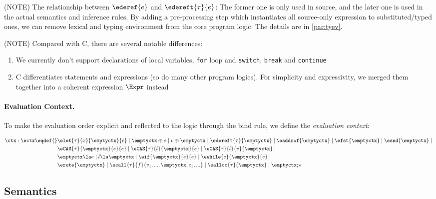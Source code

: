(NOTE) The relationship between $\ederef{e}$ and $\edereft{\tau}{e}$: The former one is only used in source,
and the later one is used in the actual semantics and inference rules.
By adding a pre-processing step which instantiates all source-only expression to substituted/typed ones,
we can remove lexical and typing environment from the core program logic. The details are in \ref{par:tyev}.

(NOTE) Compared with C, there are several notable differences:
\begin{enumerate}
  \item We currently don't support declarations of local variables, \texttt{for} loop and \texttt{switch},
    \texttt{break} and \texttt{continue}
  \item C differentiates statements and expressions (so do many other program logics). For simplicity and
    expressivity, we merged them together into a coherent expression $\Expr$ instead
\end{enumerate}

\paragraph{Evaluation Context.}

To make the evaluation order explicit and reflected to the logic through the bind rule,
we define the \emph{evaluation context}:

\begin{align*}
    \ctx : \ectx \eqdef{}&
        \elet{\tau}{x}{\emptyctx}{e} \mid
        \emptyctx \oplus e \mid
        v \oplus \emptyctx \mid
        \edereft{\tau}{\emptyctx} \mid
        \eaddrof{\emptyctx} \mid
        \efst{\emptyctx} \mid
        \esnd{\emptyctx} \mid
        \\&
        \eCAS{\tau}{\emptyctx}{e}{e} \mid
        \eCAS{\tau}{l}{\emptyctx}{e} \mid
        \eCAS{\tau}{l}{v}{\emptyctx} \mid
        \\&
        \emptyctx \la e \mid
        l \la \emptyctx \mid
        \eif{\emptyctx}{e}{e} \mid
        \ewhile{e}{\emptyctx}{e} \mid
        \\&
        \erete{\emptyctx} \mid
        \ecall{\tau}{f}{v_1, ..., \emptyctx, e_1, ...} \mid
        \ealloc{\tau}{\emptyctx} \mid
        \emptyctx ; e
\end{align*}

\subsection{Semantics}\label{sec:semantics}
